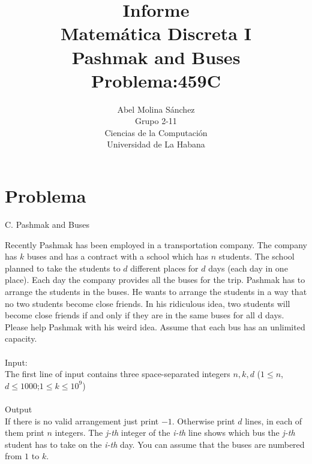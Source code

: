 \documentclass[12pt]{article}
\begin{document}
  \title{Informe\\
  Matem\'atica Discreta I\\
     Pashmak and Buses\\
     Problema:459C}
  \author{Abel Molina S\'anchez\\
  Grupo 2-11\\
  Ciencias de la Computaci\'on\\
  Universidad de La Habana}
    \maketitle  

\newpage

\section{Problema}

\begin{center}
                   
C. Pashmak and Buses

\end{center}

Recently Pashmak has been employed in a transportation company. The company has $k$ buses and has a contract with a school 
which has $n$ students. The school planned to take the students to $d$ different places for $d$ days (each day in one place). 
Each day the company provides all the buses for the trip. Pashmak has to arrange the students in the buses. He wants to arrange the students in a 
way that no two students become close friends. In his ridiculous idea, two students will become close friends if and only if they are in the same buses
 for all d days.\\
Please help Pashmak with his weird idea. Assume that each bus has an unlimited capacity.\\
\\
Input:\\
The first line of input contains three space-separated integers $n,k,d$
($1\leq n$, $d\leq 1000$;$1\leq k\leq 10^9$)\\
\\
Output\\
If there is no valid arrangement just print $-1$. 
Otherwise print $d$ lines, in each of them print $n$ integers. The \textit{j-th} integer of the 
\textit{i-th} line shows which bus the \textit{j-th} student has to take 
on the \textit{i-th} day. You can assume that the buses are numbered from $1$ to $k$.\\
\end{document}
